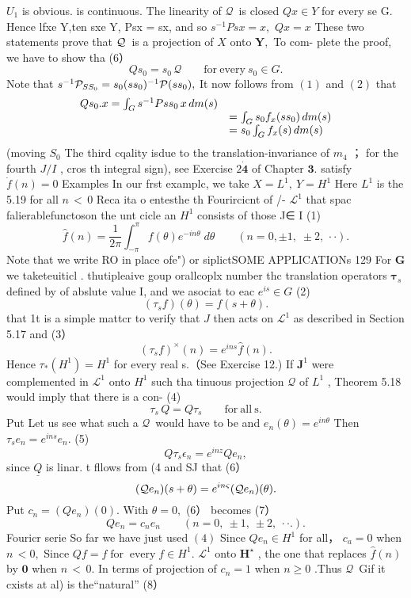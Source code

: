 $U_{\mathrm{1}}$ is obvious. is continuous. The linearity of ${\mathcal Q}\,$ is closed $Q x\in Y$ for every se G. Hence lfxe Y,ten sxe Y, Psx = sx, and so $s^{-1}P s x=x,$ $Q x=x$ These two statements prove that ${\cal Q}\,$ is a projection of $\textstyle X$ onto $\mathbf{Y},$ To com- plete the proof, we have to show tha (6） $$ Q s_{0}=s_{0}\,\mathcal{Q}\qquad\mathrm{for~every~}s_{0}\in G. $$ Note that $s^{-1}{\cal P}_{S S_{0}}=s_{0}(s s_{0})^{-1}{\cal P}(s s_{0}),$ It now follows from $(1)$ and $\left(2\right)$ that $$ \begin{array}{r l}{{Q s_{0}.x=\int_{G}s^{-1}P s s_{0}\,x\,d m(s)}}\\ {{}}&{{=\int_{G}s_{0}f_{x}(s s_{0})\,d m(s)}}\\ {{}}&{{=s_{0}\int_{G}f_{x}(s)\,d m(s)}}\end{array} $$ (moving $S_{0}$ The third cqality isdue to the translation-invariance of $m_{\mathrm{\scriptscriptstyle4}}$ ； for the fourth $J/I$ , cros th integral sign), see Exercise $2{\dot{\boldsymbol{4}}}$ of Chapter ${\mathbf{3}}.$ satisfy ${\dot{f}}(n)=0$ Examples In our frst examplc, we take $X=L^{1},~Y=H^{1}$ Here $L^{1}$ is the 5.19 for all $\scriptstyle n\,<\,0$ Reca ita o entesthe th Fourircicnt of /- ${\mathcal{L}}^{1}$ that spac falierablefunctoson the unt cicle an $H^{1}$ consists of those J∈ I (1) $$ \hat{f}(n)=\frac{1}{2\pi}\int_{-\pi}^{\pi}f(\theta)e^{-i n\theta}\;d\theta\qquad(n=0,\pm1,\;\pm2,\,\cdot\cdot). $$ Note that we write RO in place ofe") or siplictSOME APPLICATIONs 129 For ${\boldsymbol{G}}$ we taketeuiticl . thutipleaive goup orallcoplx number thc translation operators ${\boldsymbol{\tau}}_{s}$ defined by of abslute value I, and we asociat to eac $e^{i s}\in G$ (2) $$ (\tau_{s}f)(\theta)=f(s+\theta). $$ that 1t is a simple mattcr to verify that ${\boldsymbol{\mathit{J}}}$ then acts on ${\mathcal{L}}^{1}$ as described in Section 5.17 and (3） $$ (\tau_{s}f)^{\times}(n)=e^{i n s}{\hat{f}}(n). $$ Hence $\tau_{*}(H^{1})=H^{1}$ for every real s.（See Exercise 12.) If ${\boldsymbol{J}}^{1}$ were complemented in ${\mathcal{L}}^{1}$ onto $\textstyle H^{1}$ such tha tinuous projection ${\mathcal{Q}}$ of $L^{1}\!\!$ , Theorem 5.18 would imply that there is a con- (4) $$ \tau_{s}\,Q=Q\tau_{s}\qquad\mathrm{for~all~}\mathrm{s}. $$ Put Let us see what such a ${\mathcal Q}\,$ would have to be and $e_{n}(\theta)=e^{i n\theta}$ Then $\tau_{s}e_{n}=e^{i n s}e_{n}.$ (5) $$ Q\tau_{s}\epsilon_{n}=e^{i n z}Q e_{n}, $$ since $\underline{{{Q}}}$ is linar. t fllows from (4 and SJ that (6） $$ ({\cal Q}e_{n})(s+\theta)=e^{i n\varsigma}({\cal Q}e_{n})(\theta). $$ Put $c_{n}=(Q e_{n})(0).$ With $\theta=0,$ (6） becomes (7） $$ Q e_{n}=c_{n}e_{n}\qquad(n=0,\ \pm1,\ \pm2,\ \cdot\cdot.). $$ Fouricr serie So far we have just used $\left(4\right)$ Since $Q e_{n}\in H^{1}$ for all， $\scriptstyle{c_{a}=0}$ when $\scriptstyle n\,<0,$ Since $Q f=f\operatorname{for}\operatorname{every}f\in H^{1}.$ ${\mathcal{L}}^{1}$ onto ${\boldsymbol{H}}^{\star}$ , the one that replaces $\scriptstyle{\hat{f}}(n)$ by $\mathbf{0}$ when $\scriptstyle n\,<\,0.$ In terms of projection of $c_{n}=1$ when $\scriptstyle n\geq0$ .Thus ${\mathcal Q}\,$ Gif it cxists at al) is the“natural” (8） $$ 
